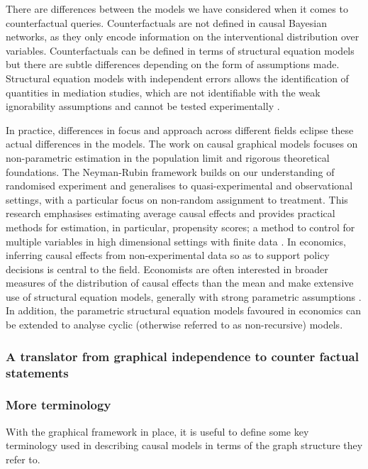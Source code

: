 \documentclass[11pt,a4paper,oneside]{book}
\theoremstyle{plain}
\theoremstyle{definition}
\begin{document}
There are differences between the models we have considered when it comes to counterfactual queries. Counterfactuals are not defined in causal Bayesian networks, as they only encode information on the interventional distribution over variables.  Counterfactuals can be defined in terms of structural equation models \cite{Pearl2000} but there are subtle differences depending on the form of assumptions made. Structural equation models with independent errors allows the identification of quantities in mediation studies, which are not identifiable with the weak ignorability assumptions and cannot be tested experimentally \cite{Richardson2013}.  

In practice, differences in focus and approach across different fields eclipse these actual differences in the models. The work on causal graphical models \cite{Pearl2000,Sprites} focuses on non-parametric estimation in the population limit and rigorous theoretical foundations. The Neyman-Rubin framework builds on our understanding of randomised experiment and generalises to quasi-experimental and observational settings, with a particular focus on non-random assignment to treatment. This research emphasises estimating average causal effects and provides practical methods for estimation, in particular, propensity scores; a method to control for multiple variables in high dimensional settings with finite data \cite{Rosenbaum1983}. In economics, inferring causal effects from non-experimental data so as to support policy decisions is central to the field. Economists are often interested in broader measures of the distribution of causal effects than the mean and make extensive use of structural equation models, generally with strong parametric assumptions \cite{Heckman2008}. In addition, the parametric structural equation models favoured in economics can be extended to analyse cyclic (otherwise referred to as non-recursive) models. 


\subsubsection{A translator from graphical independence to counter factual statements}

\subsubsection{More terminology}
With the graphical framework in place, it is useful to define some key terminology used in describing causal models in terms of the graph structure they refer to.
\end{document}
